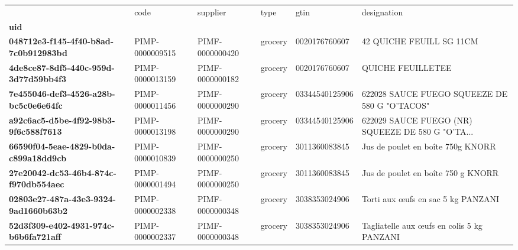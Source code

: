 \begin{table}
\centering
\label{tab:dup_gtin}
\begin{tabularx}{\linewidth}{lXXXXX}
\toprule
{} &             code &         supplier &     type &            gtin &                                        designation \\
\textbf{uid                                 } &                  &                  &          &                 &                                                    \\
\midrule
\textbf{048712e3-f145-4f40-b8ad-7c0b912983bd} &  PIMP-0000009515 &  PIMF-0000000420 &  grocery &   0020176760607 &                           42 QUICHE FEUILL SG 11CM \\
\textbf{4de8ce87-8df5-440c-959d-3d77d59bb4f3} &  PIMP-0000013159 &  PIMF-0000000182 &  grocery &   0020176760607 &                                  QUICHE FEUILLETEE \\
\textbf{7e455046-def3-4526-a28b-bc5c0e6e64fc} &  PIMP-0000011456 &  PIMF-0000000290 &  grocery &  03344540125906 &      622028 SAUCE FUEGO SQUEEZE DE 580 G "O'TACOS" \\
\textbf{a92c6ac5-d5be-4f92-98b3-9f6c588f7613} &  PIMP-0000013198 &  PIMF-0000000290 &  grocery &  03344540125906 &  622029 SAUCE FUEGO (NR) SQUEEZE DE 580 G "O'TA... \\
\textbf{66590f04-5eae-4829-b0da-c899a18dd9cb} &  PIMP-0000010839 &  PIMF-0000000250 &  grocery &   3011360083845 &                  Jus de poulet en boîte 750g KNORR \\
\textbf{27e20042-dc53-46b4-874c-f970db554aec} &  PIMP-0000001494 &  PIMF-0000000250 &  grocery &   3011360083845 &                 Jus de poulet en boîte 750 g KNORR \\
\textbf{02803e27-487a-43e3-9324-9ad1660b63b2} &  PIMP-0000002338 &  PIMF-0000000348 &  grocery &   3038353024906 &                 Torti aux œufs en sac 5 kg PANZANI \\
\textbf{52d3f309-e402-4931-974c-b6b6fa721aff} &  PIMP-0000002337 &  PIMF-0000000348 &  grocery &   3038353024906 &         Tagliatelle aux œufs en colis 5 kg PANZANI \\
\bottomrule
\end{tabularx}
\end{table}
